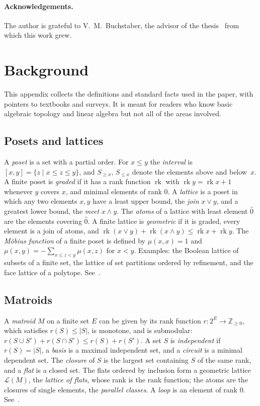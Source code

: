 \documentclass[11pt,a4paper]{article}
\numberwithin{equation}{section}
\theoremstyle{plain}
\theoremstyle{definition}
\theoremstyle{remark}
\newcommand{\Z}{\mathbb{Z}}
\newcommand{\cL}{\mathcal{L}}
\DeclareMathOperator{\rk}{rk}
\begin{document}
\paragraph{Acknowledgements.}
The author is grateful to V.~M.~Buchstaber, the advisor of the thesis~\cite{Mik22} from which this work grew.

\appendix
\section{Background}\label{app:background}

This appendix collects the definitions and standard facts used in the paper, with pointers to textbooks and surveys. It is meant for readers who know basic algebraic topology and linear algebra but not all of the areas involved.

\subsection{Posets and lattices}\label{app:posets}
A \emph{poset} is a set with a partial order. For $x\leqslant y$ the \emph{interval} is $[x,y]=\{z\mid x\leqslant z\leqslant y\}$, and $S_{\geqslant x}$, $S_{\leqslant x}$ denote the elements above and below~$x$. A finite poset is \emph{graded} if it has a rank function $\rk$ with $\rk y=\rk x+1$ whenever $y$ covers $x$, and minimal elements of rank $0$. A \emph{lattice} is a poset in which any two elements $x,y$ have a least upper bound, the \emph{join} $x\vee y$, and a greatest lower bound, the \emph{meet} $x\wedge y$. The \emph{atoms} of a lattice with least element $\hat0$ are the elements covering $\hat0$. A finite lattice is \emph{geometric} if it is graded, every element is a join of atoms, and $\rk(x\vee y)+\rk(x\wedge y)\leqslant\rk x+\rk y$. The \emph{Möbius function} of a finite poset is defined by $\mu(x,x)=1$ and $\mu(x,y)=-\sum_{x\leqslant z<y}\mu(x,z)$ for $x<y$. Examples: the Boolean lattice of subsets of a finite set, the lattice of set partitions ordered by refinement, and the face lattice of a polytope. See~\cite[Ch.~3]{Sta12}.

\subsection{Matroids}\label{app:matroids}
A \emph{matroid} $M$ on a finite set $E$ can be given by its rank function $r\colon2^E\to\Z_{\geqslant0}$, which satisfies $r(S)\leqslant|S|$, is monotone, and is submodular: $r(S\cup S')+r(S\cap S')\leqslant r(S)+r(S')$. A set $S$ is \emph{independent} if $r(S)=|S|$, a \emph{basis} is a maximal independent set, and a \emph{circuit} is a minimal dependent set. The \emph{closure} of $S$ is the largest set containing $S$ of the same rank, and a \emph{flat} is a closed set. The flats ordered by inclusion form a geometric lattice $\cL(M)$, the \emph{lattice of flats}, whose rank is the rank function; the atoms are the closures of single elements, the \emph{parallel classes}. A \emph{loop} is an element of rank $0$. See~\cite{Oxl11}.
\end{document}

